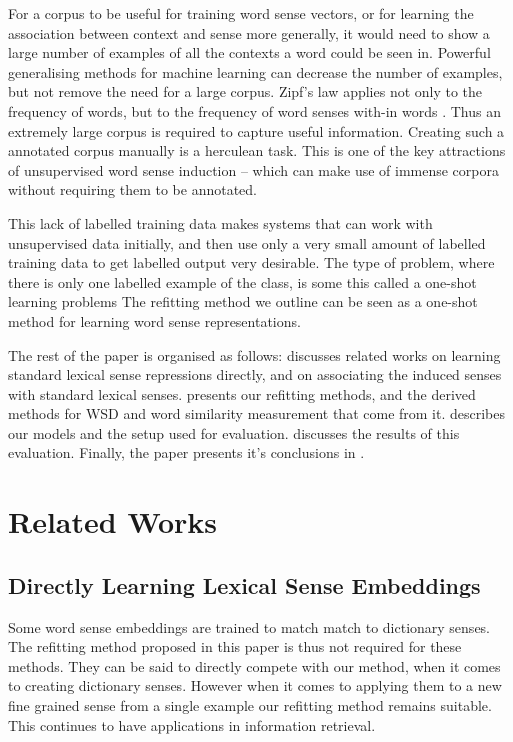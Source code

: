 \documentclass{sig-alternate}
\begin{document}
For a corpus to be useful for training word sense vectors, or for learning the association between context and sense more generally, it would need to show a large number of examples of all the contexts a word could be seen in. Powerful generalising methods for machine learning can decrease the number of examples, but not remove the need for a large corpus.
Zipf's law \parencite{zipf1949human} applies not only to the frequency of words, but to the frequency of word senses with-in words \parencite{Kilgarriff2004}. Thus an extremely large corpus is required to capture useful information. Creating such a annotated corpus manually is a herculean task. This is one of the key attractions of unsupervised word sense induction -- which can make use of immense corpora without requiring them to be annotated.

This lack of labelled training data makes systems that can work with unsupervised data initially, and then use only a very small amount of labelled training data to get labelled output very desirable.
The type of problem, where there is only one labelled example of the class, is some this called a one-shot learning problems
The refitting method we outline can be seen as a one-shot method for learning word sense representations.


The rest of the paper is organised as follows:  discusses related works on learning standard lexical sense repressions directly, and on associating the induced senses with standard lexical senses.  presents our refitting methods, and the derived methods for WSD and word similarity measurement that come from it.  describes our models and the setup used for evaluation.  discusses the results of this evaluation. Finally, the paper presents it's conclusions in .

\section{Related Works} \label{relatedwords}

\subsection{Directly Learning Lexical Sense Embeddings}
Some word sense embeddings are trained to match match to dictionary senses. The refitting method proposed in this paper is thus not required for these methods.
They can be said to directly compete with our method, when it comes to creating dictionary senses. However when it comes to applying them to a new fine grained sense from a single example our refitting method remains suitable. This continues to have applications in information retrieval.
\end{document}

